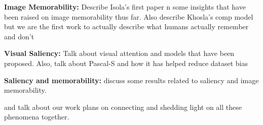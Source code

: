 
%

\textbf{Image Memorability: } Describe Isola's first paper n some insights that have been raised on image memorability thus far. Also describe Khosla's comp model but we are the first work to actually describe what humans actually remember and don't

\textbf{Visual Saliency: } Talk about visual attention and models that have been proposed. Also, talk about Pascal-S and how it has helped reduce dataset bias

\textbf{Saliency and memorability: } discuss some results related to saliency and image memorability. 

and talk about our work plans on connecting and shedding light on all these phenomena together. 